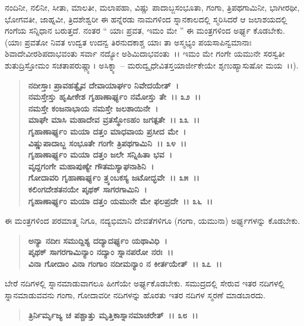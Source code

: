 ನಂದಿನೀ, ನಲಿನೀ, ಸೀತಾ, ಮಾಲತೀ, ಮಲಾಪಹಾ, ವಿಷ್ಣು ಪಾದಾಬ್ಜಸಂಭೂತಾ, ಗಂಗಾ, ತ್ರಿಪಥಗಾಮಿನೀ, ಭಾಗೀರಥೀ, ಭೋಗವತೀ, ಜಾಹ್ನವೀ, ತ್ರಿದಶೇಶ್ವರೀ ಈ ಹನ್ನೆರಡು ನಾಮಗಳಿಂದ ಸ್ನಾನಕಾಲದಲ್ಲಿ ಸ್ಮರಿಸಿದರೆ ಆ ಜಲಾಶಯದಲ್ಲಿ ಗಂಗೆಯ ಸನ್ನಿಧಾನ ಬರುತ್ತದೆ. ನಂತರ “ ಯಾಃ ಪ್ರವತ, ಇಮಂ ಮೇ ” ಈ ಮಂತ್ರಗಳಿಂದ ಅರ್ಘ್ಯ ಕೊಡಬೇಕು. (ಯಾಃ ಪ್ರವತೋ ನಿವತ ಉದ್ವತ ಉದನ್ವ ತಿರನುದಕಾಶ್ಚ ಯಾಃ ತಾ ಅಸ್ಮಭ್ಯಂ ಪಯಸಾಪಿನ್ವಮಾನಾಃ ಶಿವಾದೇವೀರಶಿಪದಾಭವಂತು ಸರ್ವಾ ನದ್ಯೋ ಅಶಿಮಿದಾಭವಂತು~।। ಇಮಂ ಮೇ ಗಂಗೇ ಯಮುನೇ ಸರಸ್ವತೀ ಶುತುದ್ರಿಸ್ತೋಮಂ ಸಚತಾಪರುಷ್ಣ್ಯಾ। ಅಸಿಕ್ನ್ಯಾ – ಮರುದ್ವೃಧೇವಿತಸ್ತಯಾರ್ಜೀಕೇಯೇ ಶೃಣುಹ್ಯಾಸುಷೋ ಮಯ~।।).

\begin{verse}
\textbf{ನದೀಸ್ತಾಃ ಪ್ರಾವಹತ್ವೈವ ದೇವಾಯಾರ್ಘಂ ನಿವೇದಯೇತ್~।}\\\textbf{ನಮಸ್ತೇಸ್ತು ಹೃಷೀಕೇಶ ಗೃಹಾಣಾರ್ಘ್ಯಂ ನಮೋಸ್ತು ತೇ~।। ೩೨~।।}\\\textbf{ನಮಸ್ತೇ ಕಂಜನಾಭಾಯ ನಮಸ್ತೇ ಜಲಶಾಯಿನೇ~।}\\\textbf{ಮಾಘೇ ಮಾಸಿ ಮಹಾದೇವ ವ್ರತಸ್ಥೋಽಹಂ ಜಗತ್ಪತೇ~।। ೩೩~।।}\\\textbf{ಗೃಹಾಣಾರ್ಘ್ಯಂ ಮಯಾ ದತ್ತಂ ಮಾಧವಾಯ ಪ್ರಸೀದ ಮೇ~।}\\\textbf{ವಿಷ್ಣುಪಾದಾಬ್ಜ ಸಂಭೂತೇ ಗಂಗೇ ತ್ರಿಪಥಗಾಮಿನಿ~।। ೩೪~।।}\\\textbf{ಗೃಹಾಣಾರ್ಘ್ಯಂ ಮಯಾ ದತ್ತಂ ಜಲೇ ಸನ್ನಿಹಿತಾ ಭವ~।}\\\textbf{ವೃದ್ದಗಂಗೇ ಮಹಾಪುಣ್ಯೇ ಗೌತಮಸ್ಯಾಘನಾಶಿನಿ~।}\\\textbf{ಗೋದಾವರಿ ಗೃಹಾಣಾರ್ಘ್ಯಂ ತ್ರ್ಯಂಬಕಸ್ಯ ಜಟೋದ್ಭವೇ~।। ೩೫~।।}\\\textbf{ಕಲಿಂಗದೇಶತನಯೇ ಪೃಥಕ್ ಸಾಗರಗಾಮಿನಿ~।}\\\textbf{ಗೃಹಾಣಾರ್ಘ್ಯಂ ಮಯಾ ದತ್ತಂ ಯಮುನೇ ಮೇ ಫಲಪ್ರದೇ~।। ೩೬~।।}
\end{verse}

ಈ ಮಂತ್ರಗಳಿಂದ ಪರಮಾತ್ಮ ನಿಗೂ, ನದ್ಯಭಿಮಾನಿ ದೇವತೆಗಳಿಗೂ (ಗಂಗಾ, ಯಮುನಾ) ಅರ್ಘ್ಯಗಳನ್ನು ಕೊಡಬೇಕು.

\begin{verse}
\textbf{ಅನ್ಯಾ ನದೀಃ ಸಮುದ್ದಿಶ್ಯ ದದ್ಯಾದರ್ಘ್ಯಂ ಯಥಾವಿಧಿ~।}\\\textbf{ಪೃಥಕ್ ಸಾಗರಗಾಮಿನ್ಯಾಂ ನದ್ಯಾಂ ಸ್ನಾನಪರೋ ನರಃ~।।}\\\textbf{ವಿನಾ ಗೋದಾಂ ವಿನಾ ಗಂಗಾಂ ನದೀಮನ್ಯಾಂ ನ ಕೀರ್ತಯೇತ್~।। ೩೭~।।}
\end{verse}

ಬೇರೆ ನದಿಗಳಲ್ಲಿ ಸ್ನಾನಮಾಡುವಾಗಲೂ ಹೀಗೆಯೇ ಅರ್ಘ್ಯಕೊಡಬೇಕು. ಸಮುದ್ರದಲ್ಲಿ ಸೇರುವ ಇತರ ನದಿಗಳಲ್ಲಿ ಸ್ನಾನಮಾಡುವವನು ಗಂಗಾ, ಗೋದಾವರೀ ನದಿಗಳನ್ನು ಹೊರತು ಇತರ ನದಿಗಳ ಸ್ಮರಣೆ ಮಾಡಬಾರದು.

\begin{verse}
\textbf{ತ್ರಿರ್ನಿರ್ಮೃಜ್ಯ ಚ ಪಶ್ಚಾತ್ತು ಮೃತ್ತಿಕಾಸ್ನಾನಮಾಚರೇತ್~।। ೩೮~।।} 
\end{verse}

